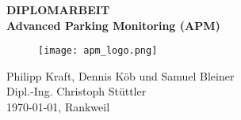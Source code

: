 
\thispagestyle{empty}
\begin{center}
  \vspace*{5mm}
  \huge{\textbf{DIPLOMARBEIT}}\\[8mm]
  \large{\textbf{Advanced Parking Monitoring (APM)}}\\[10mm]
  \begin{figure}[h] %
    \centering
    \texttt{[image: apm\_logo.png]}
  \end{figure}
  \vspace{5mm}
  Philipp Kraft, Dennis Köb und Samuel Bleiner\\[8mm]
  Dipl.-Ing. Christoph Stüttler \\[8mm]
  \today, Rankweil
  \vfill
\end{center}

